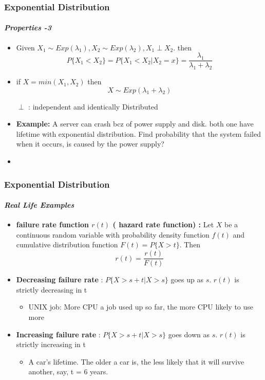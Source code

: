\documentclass{beamer}
\begin{document}
\begin{frame} 
\frametitle{ Exponential Distribution}
\framesubtitle{\textbf{\textit{Properties -3}}}
\begin{itemize}
\item Given $X_1 \sim Exp(\lambda_1 ), X_2 \sim Exp(\lambda_2 ), X_1 \perp X_2$. then 
$$P \{X_1 < X_2 \} =P \{X_1 < X_2 | X_2 = x\}  =  \frac{\lambda_1}{\lambda_1 + \lambda_2}$$  
\item 
if $ X = min(X_1 , X_2 )$ then $$ X \sim Exp(\lambda_1 + \lambda_2 )$$

$ \perp $ : independent and identically  Distributed

\item \textbf{Example:} A server can crash bcz of power supply and  disk. both one have lifetime with exponential distribution. Find probability that the system failed when it occurs, is caused by the power supply?
 
\item 

\end{itemize}

\end{frame}



\begin{frame} 
\frametitle{ Exponential Distribution}
\framesubtitle{\textbf{\textit{Real Life Examples}}}
\begin{itemize}

\item \textbf{failure rate function $r(t)$ ( hazard rate function) :} Let $X$ be a continuous random variable with probability density function
$f(t)$ and cumulative distribution function $F(t) = P \{X > t\}$. Then
$$r(t) = \frac{r(t)}{F(t)}$$
\item  \textbf{Decreasing failure rate} : $P \{X>s+ t|X>s\}$ goes up as $s$.   $r(t)$ is strictly decreasing in t
\begin{itemize}
\item UNIX job: More CPU a job used up so far, the more CPU likely to use more
\end{itemize}

\item  \textbf{Increasing failure rate} : $P \{X>s+ t|X>s\}$ goes down as $s$.  $r(t)$ is strictly increasing in t 
\begin{itemize}
\item A car’s lifetime. The older a car is, the less likely that it will survive another, say, t = 6 years.
\end{itemize}

\end{itemize}
	
\end{frame}
\end{document}

